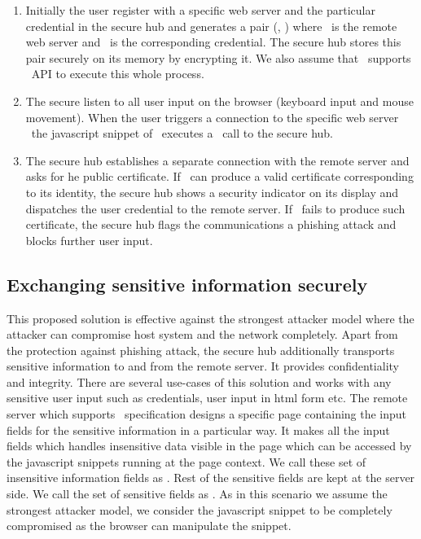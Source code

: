 \begin{enumerate}

  \item Initially the user register with a specific web server and the particular credential in the secure hub and generates a pair (\server, \credential) where \server\ is the remote web server and \credential\ is the corresponding credential. The secure hub stores this pair securely on its memory by encrypting it. We also assume that \server\ supports \webusb\ API to execute this whole process.
  
  \item The secure listen to all user input on the browser (keyboard input and mouse movement). When the user triggers a connection to the specific web server \server\ the javascript snippet of \server\ executes a \webusb\ call to the secure hub.
  
  \item The secure hub establishes a separate \tls connection with the remote server and asks for he public certificate. If \server\ can produce a valid certificate corresponding to its identity, the secure hub shows a security indicator on its display and dispatches the user credential to the remote server. If \server\ fails to produce such certificate, the secure hub flags the communications a phishing attack and blocks further user input.
\end{enumerate}


\subsection{Exchanging sensitive information securely}

This proposed solution is effective against the strongest attacker model where the attacker can compromise host system and the network completely. Apart from the protection against phishing attack, the secure hub additionally transports sensitive information to and from the remote server. It provides confidentiality and integrity. There are several use-cases of this solution and works with any sensitive user input such as credentials, user input in html form etc. The remote server \server which supports \webusb\ specification designs a specific page containing the input fields for the sensitive information in a particular way. It makes all the input fields which handles insensitive data visible in the \html page which can be accessed by the javascript snippets running at the page context. We call these set of insensitive information fields as \insensitive. Rest of the sensitive fields are kept at the server side. We call the set of sensitive fields as \sensitive. As in this scenario we assume the strongest attacker model, we consider the javascript snippet to be completely compromised as the browser can manipulate the snippet.

